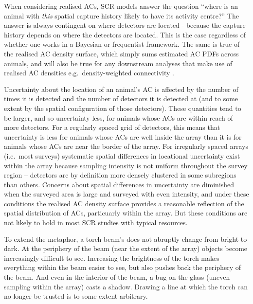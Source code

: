 \documentclass[useAMS,usenatbib,referee]{biom}
\begin{document}
When considering realised ACs, SCR models answer the question ``where is an animal with {\it this} spatial capture history likely to have its activity centre?'' The answer is always contingent on where detectors are located - because the capture history depends on where the detectors are located. This is the case regardless of whether one works in a Bayesian or frequentist framework. The same is true of the realised AC density surface, which simply sums estimated AC PDFs across animals, and will also be true for any downstream analyses that make use of realised AC densities e.g.\ density-weighted connectivity \citep{Morin2017}.

Uncertainty about the location of an animal's AC is affected by the number of times it is detected and the number of detectors it is detected at (and to some extent by the spatial configuration of those detectors). These quantities tend to be larger, and so uncertainty less, for animals whose ACs are within reach of more detectors. For a regularly spaced grid of detectors, this means that uncertainty is less for animals whose ACs are well inside the array than it is for animals whose ACs are near the border of the array. For irregularly spaced arrays (i.e.\ most surveys) systematic spatial differences in locational uncertainty exist within the array because sampling intensity is not uniform throughout the survey region -- detectors are by definition more densely clustered in some subregions than others. Concerns about spatial differences in uncertainty are diminished when the surveyed area is large and surveyed with even intensity, and under these conditions the realised AC density surface provides a reasonable reflection of the spatial distribution of ACs, particuarly within the array. But these conditions are not likely to hold in most SCR studies with typical resources.

To extend the metaphor, a torch beam's does not abruptly change from bright to dark. At the periphery of the beam (near the extent of the array) objects become increasingly difficult to see. Increasing the brightness of the torch makes everything within the beam easier to see, but also pushes back the periphery of the beam. And even in the interior of the beam, a bug on the glass (uneven sampling within the array) casts a shadow. Drawing a line at which the torch can no longer be trusted is to some extent arbitrary. 
\end{document}
